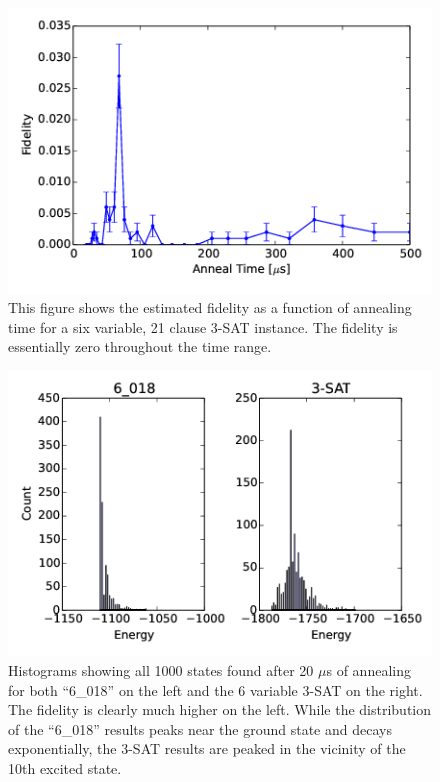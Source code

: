 \begin{figure}
	\includegraphics{img/test_6.png}
	\caption[Result of a 6 Variable 3-SAT Instance]{This figure shows the estimated fidelity as a function of annealing time for a six variable, 21 clause 3-SAT instance.  The fidelity is essentially zero throughout the time range.}
	\label{fig:test_6}
\end{figure}

\begin{figure}
	\includegraphics{img/hist.png}
	\caption[20 $\mu$s Result State Histograms]{Histograms showing all 1000 states found after 20 $\mu$s of annealing for both ``6\_018'' on the left and the 6 variable 3-SAT on the right.  The fidelity is clearly much higher on the left.  While the distribution of the ``6\_018'' results peaks near the ground state and decays exponentially, the 3-SAT results are peaked in the vicinity of the 10th excited state.}
	\label{fig:test_6_hist}
\end{figure}

